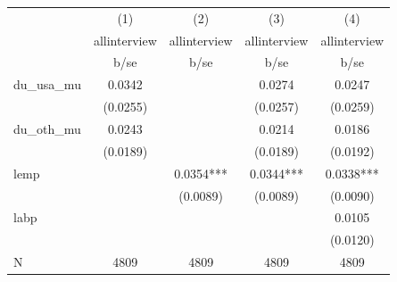 \begin{tabular}{lcccc}
\toprule
 & (1) & (2) & (3) & (4) \\
 & allinterview & allinterview & allinterview & allinterview \\
 & b/se & b/se & b/se & b/se \\
\midrule
du\_usa\_mu & 0.0342 &  & 0.0274 & 0.0247 \\
 & (0.0255) &  & (0.0257) & (0.0259) \\
du\_oth\_mu & 0.0243 &  & 0.0214 & 0.0186 \\
 & (0.0189) &  & (0.0189) & (0.0192) \\
lemp &  & 0.0354*** & 0.0344*** & 0.0338*** \\
 &  & (0.0089) & (0.0089) & (0.0090) \\
labp &  &  &  & 0.0105 \\
 &  &  &  & (0.0120) \\
\midrule
N & 4809 & 4809 & 4809 & 4809 \\
\bottomrule
\end{tabular}

